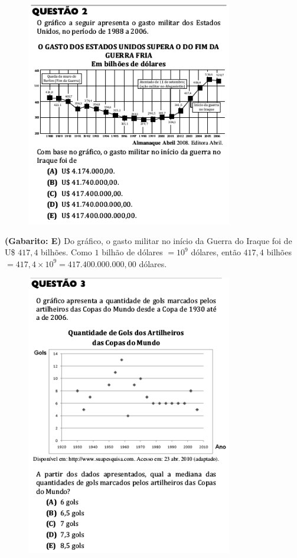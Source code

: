 \documentclass[a4paper]{article}
\begin{document}
\begin{figure}[H]
	\begin{center}
		\includegraphics[width=9cm]{L1Q2.png}
	\end{center}
\end{figure}
\par \textbf{(Gabarito: E)} Do gráfico, o gasto militar no início da Guerra do Iraque foi de U\$ $417,4$ bilhões. Como $1$ bilhão de dólares $= 10^9$ dólares, então $417,4$ bilhões $= 417,4\times 10^9 = 417.400.000.000,00$ dólares.
\begin{figure}[H]
	\begin{center}
		\includegraphics[width=9cm]{L1Q3.png}
	\end{center}
\end{figure}
\end{document}
